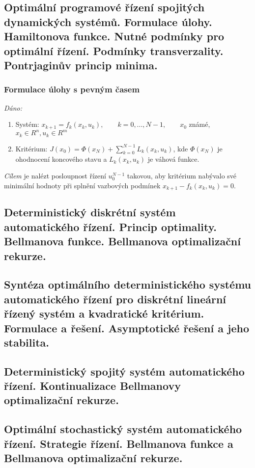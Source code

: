 \subsection{Optimální programové řízení spojitých dynamických systémů. Formulace úlohy. Hamiltonova funkce. Nutné podmínky pro optimální řízení. Podmínky transverzality. Pontrjaginův princip minima.}
\subsubsection*{Formulace úlohy s pevným časem}
\textit{Dáno:}
\begin{enumerate}
\item Systém: $ x_{k+1} = f_k(x_k, u_k), \qquad k=0,...,N-1, \qquad x_0 $ známé, $ x_k \in R^n, u_k \in R^m $
\item Kritérium: $ J(x_0) = \Phi(x_N) + \displaystyle{\sum_{k=0}^{N-1}}L_k(x_k,u_k) $, kde $ \Phi(x_N) $ je ohodnocení koncového stavu a $ L_k(x_k, u_k) $ je váhová funkce.
\end{enumerate}
\textit{Cílem} je nalézt posloupnost řízení $ u_0^{N-1} $ takovou, aby kritérium nabývalo své minimální hodnoty při splnění vazbových podmínek $ x_{k+1} - f_k(x_k, u_k) = 0 $.

\subsection{Deterministický diskrétní systém automatického řízení. Princip optimality. Bellmanova funkce. Bellmanova optimalizační rekurze.}

\subsection{Syntéza optimálního deterministického systému automatického řízení pro diskrétní lineární řízený systém a kvadratické kritérium. Formulace a řešení. Asymptotické řešení a jeho stabilita.}

\subsection{Deterministický spojitý systém automatického řízení. Kontinualizace Bellmanovy optimalizační rekurze.}

\subsection{Optimální stochastický systém automatického řízení. Strategie řízení. Bellmanova funkce a Bellmanova optimalizační rekurze.}

